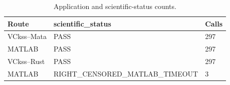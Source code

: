 \begin{table}[htbp]
\centering
\caption{Application and scientific-status counts.}
\label{tab:numerical-status}
\begin{tabular}{lll}
\toprule
Route & scientific\_status & Calls \\
\midrule
VCkss--Mata & PASS & 297 \\
MATLAB & PASS & 297 \\
VCkss--Rust & PASS & 297 \\
MATLAB & RIGHT\_CENSORED\_MATLAB\_TIMEOUT & 3 \\
\bottomrule
\end{tabular}
\end{table}
